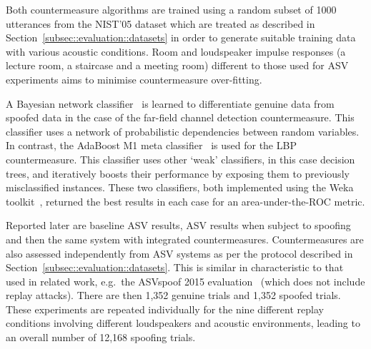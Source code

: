Both countermeasure algorithms are trained using a random subset of 1000 utterances from the NIST'05 dataset which are treated as described in Section~\ref{subsec::evaluation::datasets} in order to generate suitable training data with various acoustic conditions. 
Room and loudspeaker impulse responses (a lecture room, a staircase and a meeting room) different to those used for ASV experiments aims to minimise countermeasure over-fitting.

A Bayesian network classifier~\cite{Pearl1988} is learned to differentiate genuine data from spoofed data in the case of the far-field channel detection countermeasure.  This classifier uses a network of probabilistic dependencies between random variables.  In contrast, the AdaBoost M1 meta classifier~\cite{Freund1999} is used for the LBP countermeasure.  This classifier  uses other `weak' classifiers, in this case decision trees, and iteratively boosts their performance by exposing them to previously misclassified instances.  These two classifiers, both implemented using the Weka toolkit~\cite{Weka}, returned the best results in each case for an area-under-the-ROC metric. %

Reported later are baseline ASV results, ASV results when subject to spoofing and then the same system with integrated countermeasures.  Countermeasures are also assessed independently from ASV systems as per the protocol described in Section~\ref{subsec::evaluation::datasets}.  This is similar in characteristic to that used in related work, e.g.\ the ASVspoof 2015 evaluation~\cite{Wu2015} (which does not include replay attacks).  There are then 1,352 genuine trials and 1,352 spoofed trials.  These experiments are repeated individually for the nine different replay conditions involving different loudspeakers and acoustic environments, leading to an overall number of 12,168 spoofing trials.

